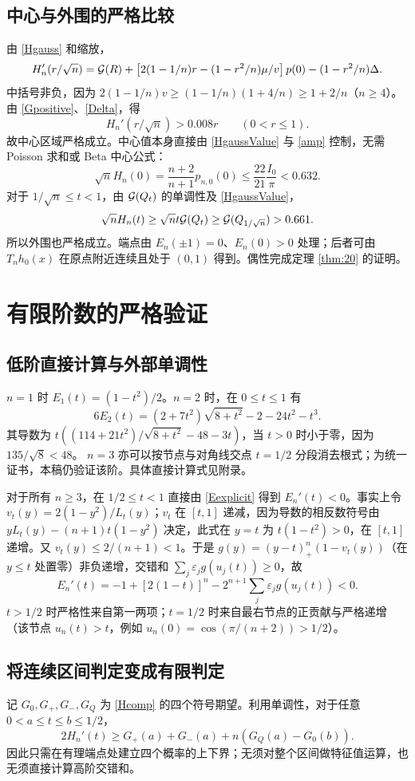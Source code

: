 \documentclass[11pt,a4paper,fontset=fandol]{ctexart}
\begin{document}
\subsection{中心与外围的严格比较}
由 \eqref{Hgauss} 和缩放，
\[H_n'(r/\sqrt n)=\mathcal G(R)+\left[2(1-1/n)r-(1-r^2/n)\mu/v\right]p(0)-(1-r^2/n)\Delta.\]
中括号非负，因为 $2(1-1/n)v\ge(1-1/n)(1+4/n)\ge1+2/n$（$n\ge4$）。由 \eqref{Gpositive}、\eqref{Delta}，得
\begin{equation}\label{localpos}
H_n'(r/\sqrt n)>0.008r\qquad(0<r\le1).
\end{equation}
故中心区域严格成立。中心值本身直接由 \eqref{HgaussValue} 与 \eqref{amp} 控制，无需 Poisson 求和或 Beta 中心公式：
\[\sqrt n H_n(0)=\frac{n+2}{n+1}p_{n,0}(0)\le\frac{22}{21}\frac{I_0}{\pi}<0.632.\]
对于 $1/\sqrt n\le t<1$，由 $\mathcal G(Q_t)$ 的单调性及 \eqref{HgaussValue}，
\[\sqrt n H_n(t)\ge\sqrt n t\mathcal G(Q_t)\ge\mathcal G(Q_{1/\sqrt n})>0.661.\]
所以外围也严格成立。端点由 $E_n(\pm1)=0$、$E_n(0)>0$ 处理；后者可由 $T_nh_0(x)$ 在原点附近连续且处于 $(0,1)$ 得到。偶性完成定理 \ref{thm:20} 的证明。

\section{有限阶数的严格验证}\label{sec:certificate}
\subsection{低阶直接计算与外部单调性}
$n=1$ 时 $E_1(t)=(1-t^2)/2$。$n=2$ 时，在 $0\le t\le1$ 有
\[6E_2(t)=(2+7t^2)\sqrt{8+t^2}-2-24t^2-t^3.\]
其导数为 $t((114+21t^2)/\sqrt{8+t^2}-48-3t)$，当 $t>0$ 时小于零，因为 $135/\sqrt8<48$。
$n=3$ 亦可以按节点与对角线交点 $t=1/2$ 分段消去根式；为统一证书，本稿仍验证该阶。具体直接计算式见附录。

对于所有 $n\ge3$，在 $1/2\le t<1$ 直接由 \eqref{Eexplicit} 得到 $E_n'(t)<0$。事实上令 $v_t(y)=2(1-y^2)/L_t(y)$；$v_t$ 在 $[t,1]$ 递减，因为导数的相反数符号由 $yL_t(y)-(n+1)t(1-y^2)$ 决定，此式在 $y=t$ 为 $t(1-t^2)>0$，在 $[t,1]$ 递增。又 $v_t(y)\le2/(n+1)<1$。于是 $g(y)=(y-t)_+^n(1-v_t(y))$（在 $y\le t$ 处置零）非负递增，交错和 $\sum_j\varepsilon_jg(u_j(t))\ge0$，故
\[E_n'(t)=-1+[2(1-t)]^n-2^{n+1}\sum_j\varepsilon_jg(u_j(t))<0.\]
$t>1/2$ 时严格性来自第一两项；$t=1/2$ 时来自最右节点的正贡献与严格递增（该节点 $u_n(t)>t$，例如 $u_n(0)=\cos(\pi/(n+2))>1/2$）。
\subsection{将连续区间判定变成有限判定}
记 $G_0,G_+,G_-,G_Q$ 为 \eqref{Hcomp} 的四个符号期望。利用单调性，对于任意 $0<a\le t\le b\le1/2$，
\begin{equation}\label{intervalLower}
2H_n'(t)\ge G_+(a)+G_-(a)+n(G_Q(a)-G_0(b)).
\end{equation}
因此只需在有理端点处建立四个概率的上下界；无须对整个区间做特征值运算，也无须直接计算高阶交错和。
\end{document}
